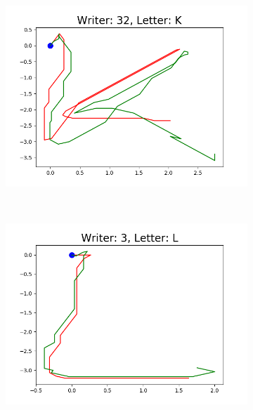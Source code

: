 \begin{figure}
\begin{subfigure}[b]{0.17\textwidth}
          \includegraphics[width=\textwidth]{images/framework/comparison_figures/K_32.png}
      \end{subfigure}
      ~
      \begin{subfigure}[b]{0.17\textwidth}
          \includegraphics[width=\textwidth]{images/framework/comparison_figures/L_3.png}
      \end{subfigure}
      ~
      \begin{subfigure}[b]{0.17\textwidth}

\end{subfigure}
\end{figure}
